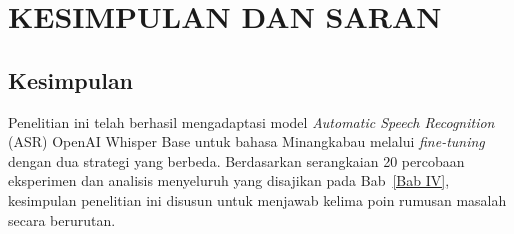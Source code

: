 \newpage
\chapter{KESIMPULAN DAN SARAN} \label{Bab V}

\section{Kesimpulan} \label{V.Kesimpulan}

Penelitian ini telah berhasil mengadaptasi model \textit{Automatic Speech Recognition} (ASR) OpenAI Whisper Base untuk bahasa Minangkabau melalui \textit{fine-tuning} dengan dua strategi yang berbeda. Berdasarkan serangkaian 20 percobaan eksperimen dan analisis menyeluruh yang disajikan pada Bab~\ref{Bab IV}, kesimpulan penelitian ini disusun untuk menjawab kelima poin rumusan masalah secara berurutan.

